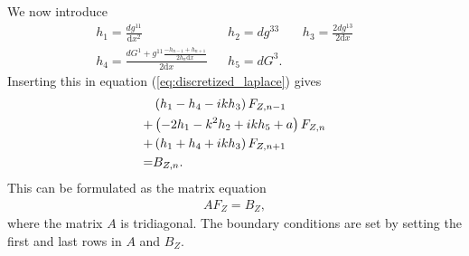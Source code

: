 %
We now introduce
%
\begin{align*}
    &h_1 = \frac{dg^{11}}{\text{d}x^2}& &h_2 = dg^{33}& &h_3 =
    \frac{2dg^{13}}{2\text{d}x}& && \\ &h_4 = \frac{dG^1 + g^{11}\frac{-h_{n-1}
    + h_{n+1}}{2h_n\text{d}x}}{2\text{d}x}& &h_5 = dG^3.& &&
\end{align*}
%
Inserting this in equation (\ref{eq:discretized_laplace}) gives
%
\begin{align*}
    &\L( h_1 - h_4 -ikh_3 \R) F_{Z,n-1} \\
    +&\L( -2h_1 - k^2h_2 +ikh_5 + a \R) F_{Z,n} \\
    +&\L( h_1 + h_4 + ikh_3 \R) F_{Z, n+1} \\
%
     =& B_{Z,n}.
\end{align*}
%
This can be formulated as the matrix equation
%
\begin{align*}
    AF_Z=B_Z,
\end{align*}
%
where the matrix $A$ is tridiagonal. The boundary conditions are set by setting
the first and last rows in $A$ and $B_Z$.
